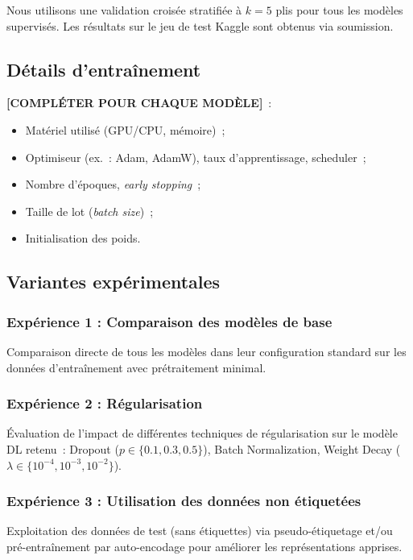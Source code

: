 \documentclass[conference]{IEEEtran}
\begin{document}
Nous utilisons une validation croisée stratifiée à $k=5$ plis pour tous les modèles supervisés.
Les résultats sur le jeu de test Kaggle sont obtenus via soumission.

\subsection{Détails d'entraînement}

\textbf{[COMPLÉTER POUR CHAQUE MODÈLE]}~:
\begin{itemize}
  \item Matériel utilisé (GPU/CPU, mémoire)~;
  \item Optimiseur (ex.~: Adam, AdamW), taux d'apprentissage, scheduler~;
  \item Nombre d'époques, \textit{early stopping}~;
  \item Taille de lot (\textit{batch size})~;
  \item Initialisation des poids.
\end{itemize}

\subsection{Variantes expérimentales}

\subsubsection{Expérience 1 : Comparaison des modèles de base}
Comparaison directe de tous les modèles dans leur configuration standard sur les données
d'entraînement avec prétraitement minimal.

\subsubsection{Expérience 2 : Régularisation}
Évaluation de l'impact de différentes techniques de régularisation sur le modèle DL retenu~:
Dropout ($p \in \{0.1, 0.3, 0.5\}$), Batch Normalization, Weight Decay
($\lambda \in \{10^{-4}, 10^{-3}, 10^{-2}\}$).

\subsubsection{Expérience 3 : Utilisation des données non étiquetées}
Exploitation des données de test (sans étiquettes) via pseudo-étiquetage et/ou pré-entraînement
par auto-encodage pour améliorer les représentations apprises.
\end{document}
